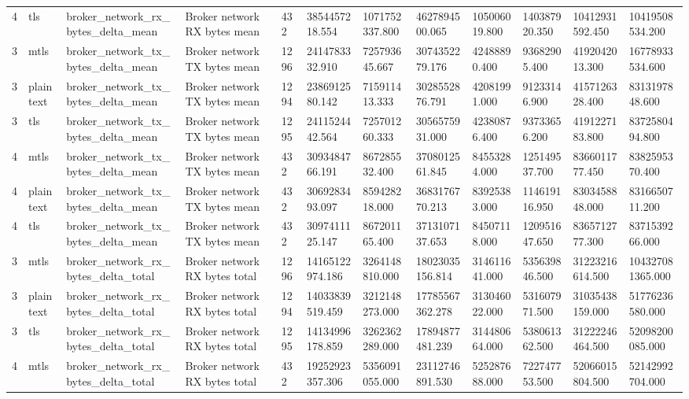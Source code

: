 \begin{longtable}{llllllllllll}
4 & tls & broker\_network\_rx\_bytes\_delta\_mean & Broker network RX bytes mean & 432 & 3854457218.554 & 1071752337.800 & 4627894500.065 & 105006019.800 & 140387920.350 & 10412931592.450 & 10419508534.200 \\
3 & mtls & broker\_network\_tx\_bytes\_delta\_mean & Broker network TX bytes mean & 1296 & 2414783332.910 & 725793645.667 & 3074352279.176 & 42488890.400 & 93682905.400 & 4192042013.300 & 16778933534.600 \\
3 & plaintext & broker\_network\_tx\_bytes\_delta\_mean & Broker network TX bytes mean & 1294 & 2386912580.142 & 715911413.333 & 3028552876.791 & 42081991.000 & 91233146.900 & 4157126328.400 & 8313197848.600 \\
3 & tls & broker\_network\_tx\_bytes\_delta\_mean & Broker network TX bytes mean & 1295 & 2411524442.564 & 725701260.333 & 3056575931.000 & 42380876.400 & 93733656.200 & 4191227183.800 & 8372580494.800 \\
4 & mtls & broker\_network\_tx\_bytes\_delta\_mean & Broker network TX bytes mean & 432 & 3093484766.191 & 867285532.400 & 3708012561.845 & 84553284.000 & 125149537.700 & 8366011777.450 & 8382595370.400 \\
4 & plaintext & broker\_network\_tx\_bytes\_delta\_mean & Broker network TX bytes mean & 432 & 3069283493.097 & 859428218.000 & 3683176770.213 & 83925383.000 & 114619116.950 & 8303458848.000 & 8316650711.200 \\
4 & tls & broker\_network\_tx\_bytes\_delta\_mean & Broker network TX bytes mean & 432 & 3097411125.147 & 867201165.400 & 3713107137.653 & 84507118.000 & 120951647.650 & 8365712777.300 & 8371539266.000 \\
3 & mtls & broker\_network\_rx\_bytes\_delta\_total & Broker network RX bytes total & 1296 & 14165122974.186 & 3264148810.000 & 18023035156.814 & 314611641.000 & 535639846.500 & 31223216614.500 & 104327081365.000 \\
3 & plaintext & broker\_network\_rx\_bytes\_delta\_total & Broker network RX bytes total & 1294 & 14033839519.459 & 3212148273.000 & 17785567362.278 & 313046022.000 & 531607971.500 & 31035438159.000 & 51776236580.000 \\
3 & tls & broker\_network\_rx\_bytes\_delta\_total & Broker network RX bytes total & 1295 & 14134996178.859 & 3262362289.000 & 17894877481.239 & 314480664.000 & 538061362.500 & 31222246464.500 & 52098200085.000 \\
4 & mtls & broker\_network\_rx\_bytes\_delta\_total & Broker network RX bytes total & 432 & 19252923357.306 & 5356091055.000 & 23112746891.530 & 525287688.000 & 722747753.500 & 52066015804.500 & 52142992704.000 \\

\end{longtable}
